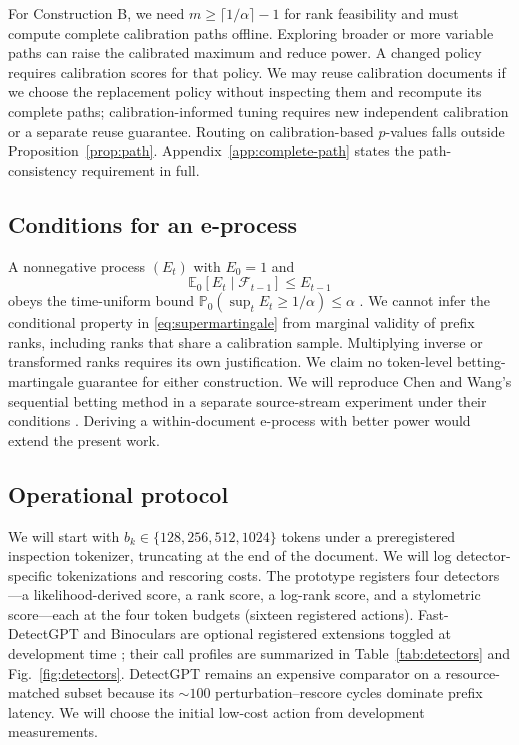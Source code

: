 \documentclass[pdflatex,sn-mathphys-num]{sn-jnl}
\newcommand{\Prob}{\mathbb{P}}
\newcommand{\Expect}{\mathbb{E}}
\newcommand{\calF}{\mathcal{F}}
\begin{document}
For Construction B, we need \(m\geq\lceil1/\alpha\rceil-1\) for rank feasibility and must compute complete calibration paths offline. Exploring broader or more variable paths can raise the calibrated maximum and reduce power. A changed policy requires calibration scores for that policy. We may reuse calibration documents if we choose the replacement policy without inspecting them and recompute its complete paths; calibration-informed tuning requires new independent calibration or a separate reuse guarantee. Routing on calibration-based \(p\)-values falls outside Proposition~\ref{prop:path}. Appendix~\ref{app:complete-path} states the path-consistency requirement in full.

\subsection{Conditions for an e-process}

A nonnegative process \((E_t)\) with \(E_0=1\) and
\begin{equation}
 \Expect_0[E_t\mid\calF_{t-1}]\leq E_{t-1}
 \label{eq:supermartingale}
\end{equation}
obeys the time-uniform bound \(\Prob_0(\sup_t E_t\geq1/\alpha)\leq\alpha\) \citep{howard2020}. We cannot infer the conditional property in \eqref{eq:supermartingale} from marginal validity of prefix ranks, including ranks that share a calibration sample. Multiplying inverse or transformed ranks requires its own justification. We claim no token-level betting-martingale guarantee for either construction. We will reproduce Chen and Wang's sequential betting method in a separate source-stream experiment under their conditions \citep{chen2025}. Deriving a within-document e-process with better power would extend the present work.

\subsection{Operational protocol}

We will start with \(b_k\in\{128,256,512,1024\}\) tokens under a preregistered inspection tokenizer, truncating at the end of the document. We will log detector-specific tokenizations and rescoring costs. The prototype registers four detectors---a likelihood-derived score, a rank score, a log-rank score, and a stylometric score---each at the four token budgets (sixteen registered actions). Fast-DetectGPT and Binoculars are optional registered extensions toggled at development time \citep{mitchell2023,bao2024,hans2024}; their call profiles are summarized in Table~\ref{tab:detectors} and Fig.~\ref{fig:detectors}. DetectGPT remains an expensive comparator on a resource-matched subset because its \(\sim100\) perturbation--rescore cycles dominate prefix latency. We will choose the initial low-cost action from development measurements.
\end{document}
